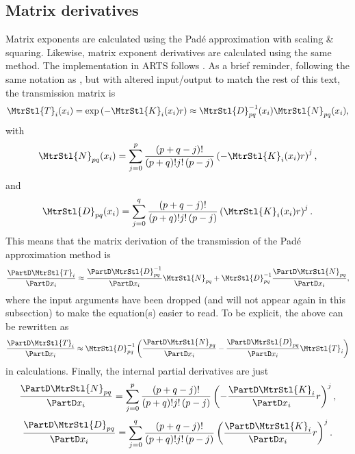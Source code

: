 \subsection{Matrix derivatives}
\label{sec:wfuns:atmvars:matder}
%
Matrix exponents are calculated using the Pad\'{e} approximation with scaling \& squaring.
Likewise, matrix exponent derivatives are calculated using the same method.
The implementation in ARTS follows \citet{brancik:06}.  As a brief reminder, following
the same notation as \citet{brancik:06}, but with
altered input/output to match the rest of this text, the transmission
matrix is
\begin{equation}
  \MtrStl{T}_i(x_i) = \exp\left(-\MtrStl{K}_i(x_i)r\right) \approx \MtrStl{D}_{pq}^{-1}(x_i)\MtrStl{N}_{pq}(x_i),\label{eq: pade}
\end{equation}
with
\begin{equation}
  \MtrStl{N}_{pq}(x_i)=\sum_{j=0}^p\frac{\left(p+q-j\right)!}{\left(p+q\right)!j!\left(p-j\right)}\left(-\MtrStl{K}_i(x_i)r\right)^j,
\end{equation}
and
\begin{equation}
  \MtrStl{D}_{pq}(x_i)=\sum_{j=0}^q\frac{\left(p+q-j\right)!}{\left(p+q\right)!j!\left(p-j\right)}\left(\MtrStl{K}_i(x_i)r\right)^j.
\end{equation}
This means that the matrix derivation of the transmission of the Pad\'{e} approximation method is
\begin{equation}
  \frac{\PartD \MtrStl{T}_i}{\PartD x_i} \approx \frac{\PartD  \MtrStl{D}_{pq}^{-1}}{\PartD x_i}\MtrStl{N}_{pq} + \MtrStl{D}_{pq}^{-1}\frac{\PartD  \MtrStl{N}_{pq}}{\PartD x_i},
\end{equation}
where the input arguments have been dropped (and will not appear again in this subsection) to make the equation(s) easier to read.
To be explicit, the above can be rewritten as
\begin{equation}
  \frac{\PartD \MtrStl{T}_i}{\PartD x_i} \approx \MtrStl{D}_{pq}^{-1}\left(\frac{\PartD  \MtrStl{N}_{pq}}{\PartD x_i} - \frac{\PartD \MtrStl{D}_{pq}}{\PartD x_i} \MtrStl{T}_i\right) \label{eq: pade derivative}
\end{equation}
in calculations.
Finally, the internal partial derivatives are just
\begin{equation}
  \frac{\PartD \MtrStl{N}_{pq}}{\PartD x_i}=\sum_{j=0}^p\frac{\left(p+q-j\right)!}{\left(p+q\right)!j!\left(p-j\right)}\left(-\frac{\PartD \MtrStl{K}_i}{\PartD x_i}r\right)^j,\label{eq: pade dn/dx}
\end{equation}
\begin{equation}
  \frac{\PartD \MtrStl{D}_{pq}}{\PartD x_i}=\sum_{j=0}^q\frac{\left(p+q-j\right)!}{\left(p+q\right)!j!\left(p-j\right)}\left(\frac{\PartD \MtrStl{K}_i}{\PartD x_i}r\right)^j.\label{eq: pade dd/dx}
\end{equation}

